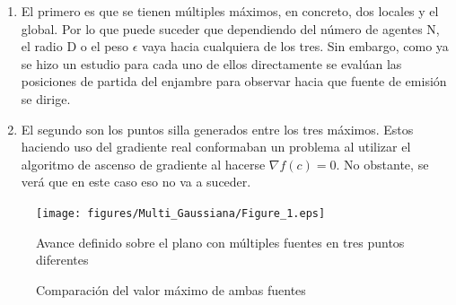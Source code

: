 \begin{enumerate}
	\item El primero es que se tienen múltiples máximos, en concreto, dos locales y el global. Por lo que puede suceder que dependiendo del número de agentes N, el radio D o el peso $\epsilon$ vaya hacia cualquiera de los tres. Sin embargo, como ya se hizo un estudio para cada uno de ellos directamente se evalúan las posiciones de partida del enjambre para observar hacia que fuente de emisión se dirige.
	\item El segundo son los puntos silla generados entre los tres máximos. Estos haciendo uso del gradiente real conformaban un problema al utilizar el algoritmo de ascenso de gradiente al hacerse $\nabla{f\left(c\right)}=0$. No obstante, se verá que en este caso eso no va a suceder.
\end{enumerate}
	
\begin{figure}[H]
\centering
\texttt{[image: figures/Multi\_Gaussiana/Figure\_1.eps]}
\caption{Avance definido sobre el plano con múltiples fuentes en tres puntos diferentes} \label{Multiples_Fuentes}
\end{figure}

\begin{figure}[H]
  \begin{center}
    \caption{Comparación del valor máximo de ambas fuentes}
    \label{Fun_Gauss_Multi}
  \end{center}
\end{figure}

